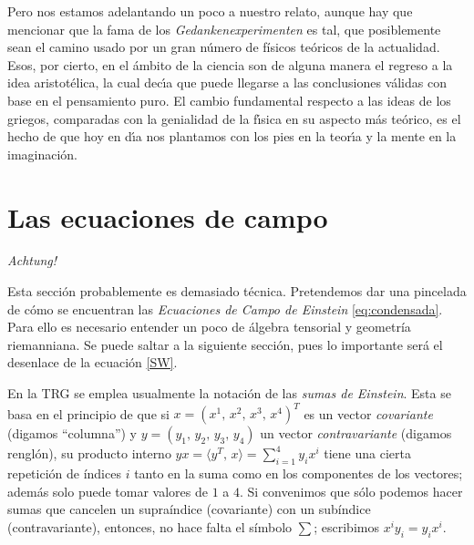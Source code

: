 \documentclass[12pt]{article}
\newenvironment{narrow}[2]{%
 \begin{list}{}{%
 \setlength{\topsep}{0pt}%
 \setlength{\leftmargin}{#1}%
 \setlength{\rightmargin}{#2}%
 \setlength{\listparindent}{\parindent}%
 \setlength{\itemindent}{\parindent}%
 \setlength{\parsep}{\parindent}}%
\item[]}{\end{list}}
\begin{document}
Pero nos estamos adelantando un poco a nuestro relato, aunque hay que mencionar que la fama de los \textit{Gedankenexperimenten} es tal, que posiblemente sean el camino usado por un gran número de físicos teóricos de la actualidad. Esos, por cierto, en el ámbito de la ciencia son de alguna manera el regreso a la idea aristot\'elica, la cual dec\'{\i}a que puede llegarse a las conclusiones v\'alidas con base en el pensamiento puro. El cambio fundamental respecto a las ideas de los griegos, comparadas con la genialidad de la f\'{\i}sica en su aspecto m\'as te\'orico, es el hecho de que hoy en d\'{\i}a nos plantamos con los pies en la teor\'{\i}a y la mente en la imaginaci\'on.





\section{Las ecuaciones de campo}

\begin{mdframed}[userdefinedwidth=17.5cm,align=center]
\smallskip \noindent
\textit{\Large Achtung!\;} \\
\begin{narrow}{1cm}{0.5cm}
\noindent Esta sección probablemente es demasiado técnica. Pretendemos dar una pincelada de cómo se encuentran las \emph{Ecuaciones de Campo de Einstein} \eqref{eq:condensada}. Para ello es necesario entender un poco de álgebra tensorial y geometría riemanniana. Se puede saltar a la siguiente sección, pues lo importante será el desenlace de la ecuación \eqref{SW}.
\smallskip
\end{narrow}
\end{mdframed}

\medskip

\noindent
En la TRG se emplea usualmente la notación de las \textit{sumas de Einstein}. Esta se basa en el principio de que si $x = (x^1,\,x^2,\,x^3,\,x^4)^T$ es un vector \textit{covariante} (digamos ``columna'') y $y = (y_1,\,y_2,\,y_3,\,y_4)$ un vector \textit{contravariante} (digamos renglón), su producto interno $yx = \langle y^T,\,x\rangle = \sum_{i = 1}^4 y_ix^i$ tiene una cierta repetición de índices $i$ tanto en la suma como en los componentes de los vectores; además solo puede tomar valores de $1$ a $4$. Si convenimos que sólo podemos hacer sumas que cancelen un supraíndice (covariante) con un subíndice (contravariante), entonces, no hace falta el símbolo $\sum$; escribimos $x^iy_i = y_ix^i$.
\end{document}

